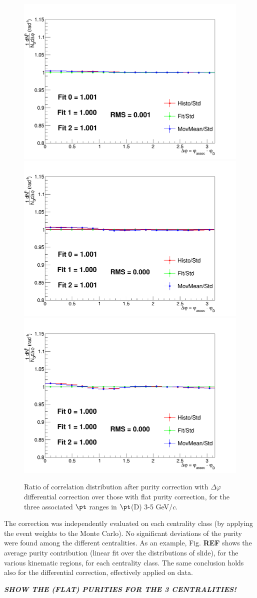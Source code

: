 \begin{figure}
\centering
{\includegraphics[width=0.45\linewidth]{figuresVsCent/Global/Purity/PurityCheck1.png}}
{\includegraphics[width=0.45\linewidth]{figuresVsCent/Global/Purity/PurityCheck2.png}} \\
{\includegraphics[width=0.45\linewidth]{figuresVsCent/Global/Purity/PurityCheck3.png}}
 \caption{Ratio of correlation distribution after purity correction with $\Delta\varphi$ differential correction over those with flat purity correction, for the three associated $\pt$ ranges in $\pt$(D) 3-5 GeV/$c$.}
\label{fig:PurityAppr}
\end{figure}

The correction was independently evaluated on each centrality class (by applying the event weights to the Monte Carlo).
No significant deviations of the purity were found among the different centralities.
As an example, Fig. {\bf REF} shows the average purity contribution (linear fit over the distributions of slide), for the various kinematic regions, for each centrality class. The same conclusion holds also for the differential correction, effectively applied on data.

\textit{\textbf{SHOW THE (FLAT) PURITIES FOR THE 3 CENTRALITIES!}}

